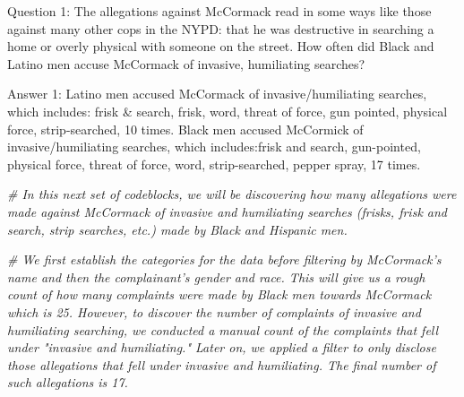 \documentclass[
]{article}
\newenvironment{Shaded}{\begin{snugshade}}{\end{snugshade}}
\newcommand{\CommentTok}[1]{\textcolor[rgb]{0.56,0.35,0.01}{\textit{#1}}}
\begin{document}
Question 1: The allegations against McCormack read in some ways like
those against many other cops in the NYPD: that he was destructive in
searching a home or overly physical with someone on the street. How
often did Black and Latino men accuse McCormack of invasive, humiliating
searches?

Answer 1: Latino men accused McCormack of invasive/humiliating searches,
which includes: frisk \& search, frisk, word, threat of force, gun
pointed, physical force, strip-searched, 10 times. Black men accused
McCormick of invasive/humiliating searches, which includes:frisk and
search, gun-pointed, physical force, threat of force, word,
strip-searched, pepper spray, 17 times.

\begin{Shaded}
\begin{Highlighting}[]
\CommentTok{# In this next set of codeblocks, we will be discovering how many allegations were made against McCormack of invasive and humiliating searches (frisks, frisk and search, strip searches, etc.) made by Black and Hispanic men.}

\CommentTok{# We first establish the categories for the data before filtering by McCormack's name and then the complainant's gender and race. This will give us a rough count of how many complaints were made by Black men towards McCormack which is 25. However, to discover the number of complaints of invasive and humiliating searching, we conducted a manual count of the complaints that fell under "invasive and humiliating." Later on, we applied a filter to only disclose those allegations that fell under invasive and humiliating. The final number of such allegations is 17.}


\end{Highlighting}
\end{Shaded}
\end{document}
